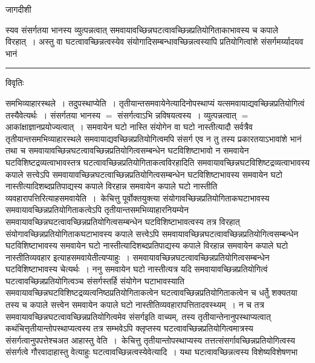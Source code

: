 \documentclass[10pt, openany]{book}
\begin{document}
{\newpage
\begin{center} जागदीशी \end{center}
{\la स्यव संसर्गतया भानस्य व्युत्पन्नत्वात् समवायावच्छिन्नघटत्वावच्छिन्नप्रतियोगिताकाभावस्य च कपाले विरहात्~। अस्तु वा घटत्वावच्छिन्नत्वस्येव
संयोगादिसम्बन्धावच्छिन्नत्वस्यापि प्रतियोगित्वांशे संसर्गमर्य्यादयव भानं}\\
\hrule
\begin{center}     विवृतिः \end{center}
समभिव्याहारस्थले~। तदुपस्थाप्येति~। तृतीयान्तसमवायेनेत्यादिनोपस्थाप्यं
यत्समवायाद्यवच्छिन्नप्रतियोगित्वं तस्यैवेत्यर्थः~। संसर्गतया
भानस्य $=$ संसर्गत्वाऽभि
न्नविषयत्वस्य~। व्युत्पन्नत्वात् $=$ आकांक्षाज्ञानप्रयोज्यत्वात्~। समवायेन
घटो नास्ति संयोगेन वा घटो नास्तीत्यादौ सर्वत्रैव तृतीयान्तसमभिव्याहारस्थले
समवायाद्यवच्छिन्नप्रतियोगित्वमपि संसर्ग एव न तु तस्य प्रकारतयाऽभावांशे भानं तथा च समवायावच्छिन्नघटत्वावच्छिन्नप्रतियोगित्वसम्बन्धेन घटविशिष्टाभावो न
समवायेन घटविशिष्टद्रव्यत्वाभावस्तत्र घटत्वावच्छिन्नप्रतियोगिताकत्वविरहादिति
समवायावच्छिन्नघटविशिष्टद्रव्यत्वाभावस्य कपाले सत्त्वेऽपि
समवायावच्छिन्नघटत्वाच्छिन्नप्रतियोगित्वसम्बन्धेन घटविशिष्टाभावस्य समवायेन घटो
नास्तीत्यादिशब्दप्रतिपाद्यस्य कपाले विरहान्न समवायेन कपाले घटो नास्तीति व्यवहारापत्तिरित्याह\textendash  समवायेति~।~{\la केचित्तु} पूर्वोक्तयुक्त्या संयोगावच्छिन्नप्रतियोगिताकघटाभावस्य
समवायावच्छिन्नप्रतियोगिताकत्वेऽपि तृतीयान्तसमभिव्याहारनियम्येन समवायावच्छिन्नघटत्वावच्छिन्नप्रतियोगित्वसम्बन्धेन घटविशिष्टाभावत्वस्य तत्र
विरहात् संयोगावच्छिन्नप्रतियोगिताकघटाभावस्य कपाले सत्त्वेऽपि समवायावच्छिन्नघटत्वावच्छिन्नप्रतियोगित्वसम्बन्धेन घटविशिष्टाभावस्य समवायेन घटो
नास्तीत्यादिशब्दप्रतिपाद्यस्य कपाले विरहान्न समवायेन कपाले घटो नास्तीतिव्यवहार इत्याह\textendash समवायेतीत्यप्याहुः~। समवायावच्छिन्नघटत्वावच्छिन्नप्रतियोगित्वसम्बन्धेन घटविशिष्टाभावस्य चेत्यर्थः~। ननु समवायेन घटो नास्तीत्यत्र यदि समवायावच्छिन्नप्रतियोगित्वं घटत्वावच्छिन्नप्रतियोगित्वञ्च संसर्गस्तर्हि संयोगेन घटाभावस्याति समवायावच्छिन्नघटविशिष्टद्रव्यत्वनिष्ठप्रतियोगिताकत्वेन घटत्वावच्छिन्नप्रतियोगिताकत्वेन च धर्तेु शक्यतया तस्य च कपाले सत्त्वेन समवायेन
कपाले घटो नास्तीतिव्यवहारापत्तितादवस्थ्यम्~। न च तत्र समवायावच्छिन्नघटत्वावच्छिन्नप्रतियोगित्वमेव संसर्गइति वाच्यम्, तस्य तृतीयान्तेनानुपस्थाप्यत्वात्
कथंचित्तृतीयान्तोपस्थाप्यत्वस्य तत्र सम्भवेऽपि क्लृप्तस्य घटत्वावच्छिन्नप्रतियोगित्वमात्रस्य संसर्गत्वानुपपत्तेश्च\textendash अत आहास्तु वेति~।~{\la केचित्तु}
तृतीयान्तोपस्थाप्यस्य तत्तत्संसर्गावच्छिन्नप्रतियोगित्वस्य संसर्गत्वे गौरवादाहास्तु वेत्याहुः घटत्वावच्छिन्नत्वस्येवेत्यादि~। यथा घटत्वावच्छिन्नत्वस्य विशेष्यविशेषणभा
}
\end{document}
